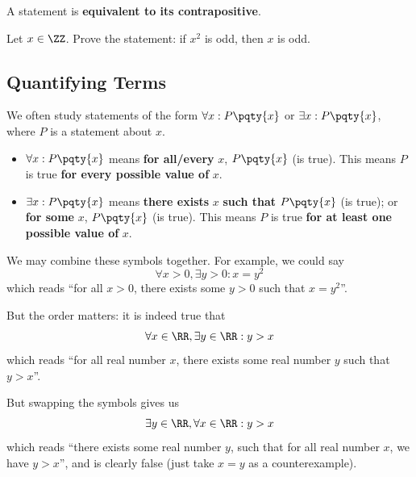 \documentclass{article}
\begin{document}
A statement is \textbf{equivalent to its contrapositive}.

\begin{example}
    Let \(x \in \ZZ\). Prove the statement: if \(x^2\) is odd, then \(x\) is odd.
\end{example}

\subsection{Quantifying Terms}

We often study statements of the form \(\forall x: P\pqty{x}\) or \(\exists x: P\pqty{x}\), where \(P\) is a statement about \(x\).

\begin{itemize}
    \item \(\forall x: P\pqty{x}\) means \textbf{for all/every} \(x\), \(P\pqty{x}\) (is true). This means \(P\) is true \textbf{for every possible value of} \(x\).
    \item \(\exists x: P\pqty{x}\) means \textbf{there exists} \(x\) \textbf{such that} \(P\pqty{x}\) (is true); or \textbf{for some} \(x\), \(P\pqty{x}\) (is true). This means \(P\) is true \textbf{for at least one possible value of} \(x\).
\end{itemize}

We may combine these symbols together. For example, we could say
\[
    \forall x > 0, \exists y > 0: x = y^2
\]
which reads ``for all \(x > 0\), there exists some \(y > 0\) such that \(x = y^2\)''.

But the order matters: it is indeed true that
\[
    \forall x \in \RR, \exists y \in \RR: y > x
\]
which reads ``for all real number \(x\), there exists some real number \(y\) such that \(y > x\)''.

But swapping the symbols gives us
\[
    \exists y \in \RR, \forall x \in \RR: y > x
\]
which reads ``there exists some real number \(y\), such that for all real number \(x\), we have \(y > x\)'', and is clearly false (just take \(x = y\) as a counterexample).
\end{document}
